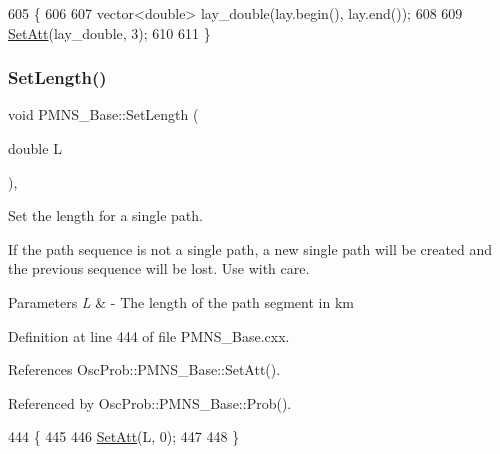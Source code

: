 \begin{DoxyCode}
605                                            \{
606 
607   vector<double> lay\_double(lay.begin(), lay.end());
608 
609   \hyperlink{classOscProb_1_1PMNS__Base_aba565962a440d14bee7a2a96d2eca2c5}{SetAtt}(lay\_double, 3);
610 
611 \}
\end{DoxyCode}
\mbox{\label{classOscProb_1_1PMNS__Base_a6241325b1bd28cafa556daaecbe4ed62}} 
\subsubsection{\texorpdfstring{Set\+Length()}{SetLength()}\hspace{0.1cm}{\footnotesize\ttfamily [1/2]}}
{\footnotesize\ttfamily void P\+M\+N\+S\+\_\+\+Base\+::\+Set\+Length (\begin{DoxyParamCaption}\item[{double}]{L }\end{DoxyParamCaption})\hspace{0.3cm}{\ttfamily [virtual]}, {\ttfamily [inherited]}}

Set the length for a single path.

If the path sequence is not a single path, a new single path will be created and the previous sequence will be lost. Use with care.


\begin{DoxyParams}{Parameters}
{\em L} & -\/ The length of the path segment in km \\
\hline
\end{DoxyParams}


Definition at line 444 of file P\+M\+N\+S\+\_\+\+Base.\+cxx.



References Osc\+Prob\+::\+P\+M\+N\+S\+\_\+\+Base\+::\+Set\+Att().



Referenced by Osc\+Prob\+::\+P\+M\+N\+S\+\_\+\+Base\+::\+Prob().


\begin{DoxyCode}
444                                  \{
445 
446   \hyperlink{classOscProb_1_1PMNS__Base_aba565962a440d14bee7a2a96d2eca2c5}{SetAtt}(L, 0);
447 
448 \}
\end{DoxyCode}
\mbox{\label{classOscProb_1_1PMNS__Base_aa34a40a3b5abda0f252982d9ead3b520}} 
